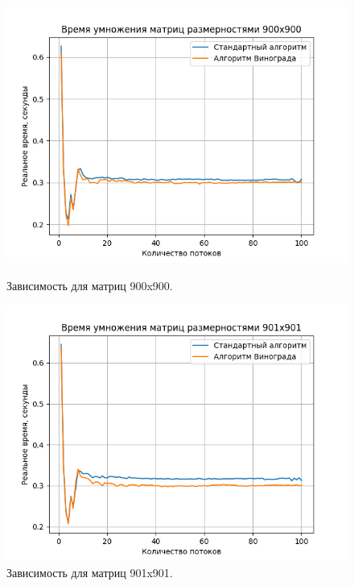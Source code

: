 \documentclass[a4paper,12pt]{article}
\begin{document}
\begin{figure}[H]
\begin{center}
\begin{minipage}[H]{0.48\linewidth}
\includegraphics[width=1\linewidth]{900x900.png}
\caption{Зависимость для матриц 900x900.}
\label{ris:experimoriginal}
\end{minipage}
\hfill
\begin{minipage}[H]{0.48\linewidth}
\includegraphics[width=1\linewidth]{901x901.png}
\caption{Зависимость для матриц 901x901.}
\label{ris:experimcoded}
\end{minipage}
\end{center}
\begin{center}
\begin{minipage}[H]{0.48\linewidth}

\end{minipage}
\end{center}
\end{figure}
\end{document}
